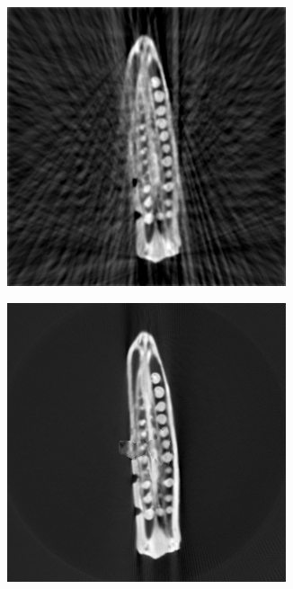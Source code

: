 \documentclass{article}
\begin{document}
\begin{figure}[!h]
\begin{subfigure}[b]{0.31\linewidth}
        \caption{}
    \end{subfigure}    
    \begin{subfigure}[b]{0.31\linewidth}
        \includegraphics[width=\textwidth]{../images/svm/okra/result_pilot.png}

        \caption{}
    \end{subfigure}
    \quad
    \begin{subfigure}[b]{0.31\linewidth}
        \includegraphics[width=\textwidth]{../images/svm/okra/resultStitched_svm.png}


\end{subfigure}
\end{figure}
\end{document}

